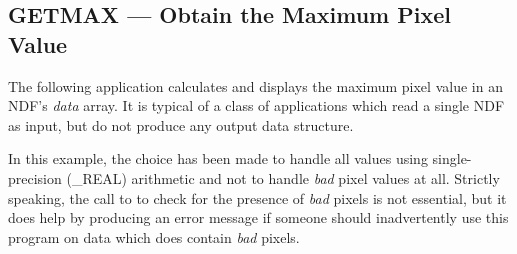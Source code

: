 \documentclass[twoside,11pt,nolof]{starlink}
\providecommand{\st}[1]{{\emph{#1}}}
\begin{document}
\newpage
\subsection{GETMAX --- Obtain the Maximum Pixel Value}

The following application calculates and displays the maximum pixel value in an
NDF's \st{data\/} array. It is typical of a class of applications which read a
single NDF as input, but do not produce any output data structure.

In this example, the choice has been made to handle all values using
single-precision (\_REAL) arithmetic and not to handle \st{bad\/}
pixel values at all.  Strictly speaking, the call to  to
check for the presence of \st{bad\/} pixels is not essential, but it
does help by producing an error message if someone should
inadvertently use this program on data which does contain \st{bad\/}
pixels.
\end{document}
